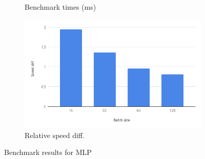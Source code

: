 {\begin{figure}[!hbtp]
\begin{subfigure}[b]{0.49\textwidth}
			\caption{Benchmark times (ms)}
		\end{subfigure}
		\begin{subfigure}[b]{0.49\textwidth}
			\includegraphics[width=\textwidth]{pics/Speedupmlp}	
			\caption{Relative speed diff.}
		\end{subfigure}
		\caption{Benchmark results for MLP}
		\label{fig:mlp}
	\end{figure}
	
}
